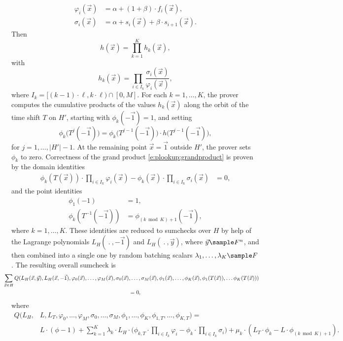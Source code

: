 \documentclass[11pt]{article}
\theoremstyle{definition}
\theoremstyle{definition}
\begin{document}
\begin{align*}
\varphi_{i} (\vec x) &=\alpha +  (1+\beta)\cdot f_i(\vec x),
\\
\sigma_{i}(\vec x) &= \alpha + s_i(\vec x) + \beta\cdot s_{i+1}(\vec x). 
\end{align*}
Then 
\[
h(\vec x) %
= \prod_{k=1}^K h_k(\vec x),
\]
with
\[
h_k(\vec x) = \prod_{i\in I_k}  \frac{\sigma_i(\vec x)}{\varphi_i(\vec x)}, 
\]
where $I_k = [(k-1)\cdot \ell, k\cdot\ell) \cap [0, M]$.
For each $k=1, \ldots, K$, the prover computes the cumulative products of the values $h_k(\vec x)$ along the orbit of the time shift $T$ on $H'$, starting with $\phi_k(-\vec 1) = 1$, and setting
\[
\phi_k\big(T^{j}(-\vec 1)\big) = \phi_k\big(T^{j-1}(-\vec 1)\big) \cdot h\big(T^{j-1}(-\vec 1)\big),
\]
for $j= 1, \ldots, |H'|-1$.
At the remaining point $\vec x = \vec 1$ outside $H'$, the prover sets $\phi_k$ to zero.
Correctness of the grand product \eqref{e:plookup:grandproduct} is proven by the domain identities
\begin{align*}
\phi_k(T(\vec x))\cdot \prod_{i\in I_k} \varphi_i(\vec x) - \phi_k(\vec x)\cdot \prod_{i\in I_k}  \sigma_i(\vec x) &= 0,
\end{align*}
and the point identities
\begin{align*}
\phi_{1}(-1) &= 1,
\\
\phi_k(T^{-1}(-\vec 1)) &=  \phi_{(k\bmod K)+1}(-\vec 1), 
\end{align*}
where $k= 1, \ldots, K$.
These identities are reduced to sumchecks over $H$ by help of the Lagrange polynomials $L_H(\:.\:, -\vec 1)$ and $L_H(\:.\:, \vec y)$, where $\vec y\sample F^n$, and then combined into a single one by random batching scalars $\lambda_1, \ldots, \lambda_K\sample F$.
The resulting overall sumcheck is
\begin{multline*}
\hspace*{-0.5cm}
\sum_{\vec x\in H} Q(L_H(\vec x, \vec y), L_H(\vec x, -\vec 1),  \varphi_{0}(\vec x),\ldots, \varphi_{M}(\vec x), \sigma_{0}(\vec x),\ldots, \sigma_{M}(\vec x),  \phi_1(\vec x),\ldots, \phi_{K}(\vec x), \phi_1(T(\vec x)), \ldots \phi_K(T(\vec x))) 
\\
= 0,
\end{multline*}
where
\begin{equation}
\label{e:lookup:hyperplonk:Q}
\begin{aligned}
Q(L_H, &L, L_T, \varphi_0,\ldots, \varphi_M, \sigma_0,\ldots, \sigma_{M}, \phi_1, \ldots, \phi_K, \phi_{1,T}, \ldots, \phi_{K,T}) 
= 
\\&
L \cdot (\phi - 1) + \sum_{k=1}^K \lambda_k\cdot  L_H \cdot \Big(\phi_{k,T} \cdot \prod_{i\in I_k} \varphi_i
- \phi_k\cdot \prod_{i\in I_k} \sigma_i \Big)+ \mu_k \cdot \left( L_T\cdot \phi_k - L\cdot \phi_{(k \bmod K) + 1}\right). 
\end{aligned} 
\end{equation}
\end{document}
